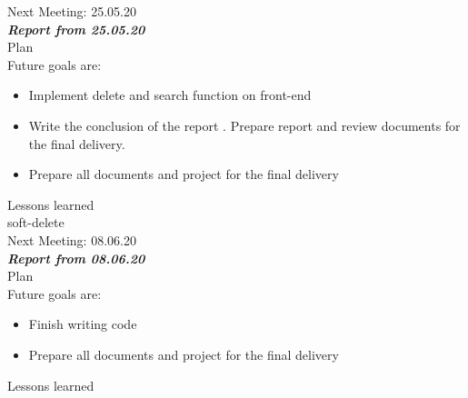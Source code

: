 \documentclass{scrartcl}
\begin{document}
Next Meeting: 25.05.20\\

\textbf{\textit{Report from 25.05.20  }}\\
Plan\\
Future goals are: 
\begin{itemize}


	\item Implement delete and search function on front-end
	\item Write the conclusion of the report . Prepare report and review documents for the final delivery.
	\item Prepare all documents and project for the final delivery
\end{itemize}	
Lessons learned\\
soft-delete\\
Next Meeting: 08.06.20\\

\textbf{\textit{Report from  08.06.20 }}\\
Plan\\
Future goals are: 
\begin{itemize}


	\item Finish writing code
	\item Prepare all documents and project for the final delivery
\end{itemize}	
Lessons learned\\


\end{document}
